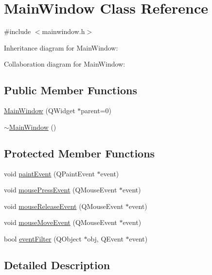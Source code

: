 \hypertarget{class_main_window}{}\section{Main\+Window Class Reference}
\label{class_main_window}


{\ttfamily \#include $<$mainwindow.\+h$>$}



Inheritance diagram for Main\+Window\+:


Collaboration diagram for Main\+Window\+:
\subsection*{Public Member Functions}
\begin{DoxyCompactItemize}
\item 
\mbox{\hyperlink{class_main_window_a8b244be8b7b7db1b08de2a2acb9409db}{Main\+Window}} (Q\+Widget $\ast$parent=0)
\item 
\mbox{\hyperlink{class_main_window_ae98d00a93bc118200eeef9f9bba1dba7}{$\sim$\+Main\+Window}} ()
\end{DoxyCompactItemize}
\subsection*{Protected Member Functions}
\begin{DoxyCompactItemize}
\item 
void \mbox{\hyperlink{class_main_window_abf05d580e91f725777cdb6a5eb0bf08c}{paint\+Event}} (Q\+Paint\+Event $\ast$event)
\item 
void \mbox{\hyperlink{class_main_window_a2b5463ae209a03d1680b39c950dac8be}{mouse\+Press\+Event}} (Q\+Mouse\+Event $\ast$event)
\item 
void \mbox{\hyperlink{class_main_window_a32bbb036a55856e49c31a5348f937b53}{mouse\+Release\+Event}} (Q\+Mouse\+Event $\ast$event)
\item 
void \mbox{\hyperlink{class_main_window_a2cf42454562815dd44c716e78d515697}{mouse\+Move\+Event}} (Q\+Mouse\+Event $\ast$event)
\item 
bool \mbox{\hyperlink{class_main_window_aa0916a59a9d7ee37159ed0a2e0528960}{event\+Filter}} (Q\+Object $\ast$obj, Q\+Event $\ast$event)
\end{DoxyCompactItemize}


\subsection{Detailed Description}


